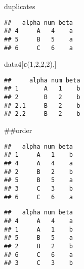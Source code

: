 \documentclass[ignorenonframetext,]{beamer}
\newenvironment{Shaded}{\begin{snugshade}}{\end{snugshade}}
\newcommand{\DecValTok}[1]{\textcolor[rgb]{0.00,0.00,0.81}{#1}}
\newcommand{\KeywordTok}[1]{\textcolor[rgb]{0.13,0.29,0.53}{\textbf{#1}}}
\newcommand{\NormalTok}[1]{#1}
\newcommand{\OperatorTok}[1]{\textcolor[rgb]{0.81,0.36,0.00}{\textbf{#1}}}
\begin{document}
\begin{frame}[fragile]{duplicates}
\protect\hypertarget{duplicates}{}

\begin{Shaded}
\end{Shaded}

\begin{verbatim}
##   alpha num beta
## 4     A   4    a
## 5     B   5    a
## 6     C   6    a
\end{verbatim}

\begin{Shaded}
\begin{Highlighting}[]
\NormalTok{data4[}\KeywordTok{c}\NormalTok{(}\DecValTok{1}\NormalTok{,}\DecValTok{2}\NormalTok{,}\DecValTok{2}\NormalTok{,}\DecValTok{2}\NormalTok{),]}
\end{Highlighting}
\end{Shaded}

\begin{verbatim}
##     alpha num beta
## 1       A   1    b
## 2       B   2    b
## 2.1     B   2    b
## 2.2     B   2    b
\end{verbatim}

\#\#order

\begin{Shaded}
\end{Shaded}

\begin{verbatim}
##   alpha num beta
## 1     A   1    b
## 4     A   4    a
## 2     B   2    b
## 5     B   5    a
## 3     C   3    b
## 6     C   6    a
\end{verbatim}

\begin{Shaded}
\end{Shaded}

\begin{verbatim}
##   alpha num beta
## 4     A   4    a
## 1     A   1    b
## 5     B   5    a
## 2     B   2    b
## 6     C   6    a
## 3     C   3    b
\end{verbatim}


\end{frame}
\end{document}
